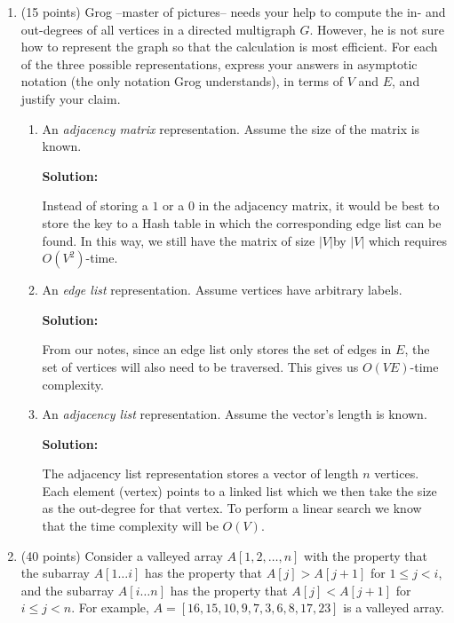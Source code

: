 \documentclass{article}
\begin{document}
\begin{enumerate}
	\item (15 points) Grog --master of pictures-- needs your help to compute the in- and out-degrees of all vertices in a directed multigraph $G$. However, he is not sure how to represent the graph so that the calculation is most efficient. For each of the three possible representations, express your answers in asymptotic notation (the only notation Grog understands), in terms of $V$ and $E$, and justify your claim.
	\begin{enumerate}
	\item An \textit{adjacency matrix} representation. Assume the size of the matrix is known.\par
    \textbf{Solution:}\par
        Instead of storing a $1$ or a $0$ in the adjacency matrix, it would be best to store the key to a Hash table 
        in which the corresponding edge list can be found. In this way, we still have the matrix of size $|V|$by $|V|$ which 
        requires $O(V^2)$-time.
	\item An \textit{edge list} representation. Assume vertices have arbitrary labels.\par
    \textbf{Solution:}\par
        From our notes, since an edge list only stores the set of edges in $E$, the set of vertices will also need to be traversed. 
        This gives us $O(VE)$-time complexity. 
    \item An \textit{adjacency list} representation. Assume the vector's length is known.\par
    \textbf{Solution:}\par
        The adjacency list representation stores a vector of length $n$ vertices. Each element (vertex) points to a linked list
        which we then take the size as the out-degree for that vertex. To perform a linear search we know that the time complexity 
        will be $O(V)$. 
    \end{enumerate}
	
	\pagebreak
    
    \item (40 points) Consider a valleyed array $A[1, 2, \ldots, n]$ with the property that the subarray $A[1\ldots i]$ has the property that $A[j] > A[j + 1]$ for $1 \leq j < i$, and the subarray $A[i \ldots n]$ has the property that $A[j] < A[j + 1]$ for $i \leq j < n$. For example, \newline $A = [16, 15, 10, 9, 7, 3, 6, 8, 17, 23]$ is a valleyed array.
    

\end{enumerate}
\end{document}
